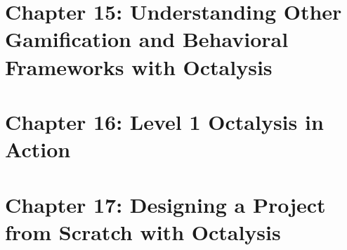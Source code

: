 \documentclass{article}
\theoremstyle{definition}
\theoremstyle{remark}
\begin{document}
\newpage

\section{Chapter 15: Understanding Other Gamification and Behavioral Frameworks with Octalysis}


\newpage

\section{Chapter 16: Level 1 Octalysis in Action}


\newpage

\section{Chapter 17: Designing a Project from Scratch with Octalysis}



\end{document}
